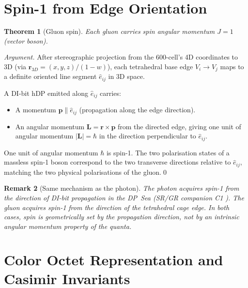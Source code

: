\documentclass[11pt,a4paper]{article}
\newtheorem{theorem}{Theorem}[section]
\newtheorem{remark}[theorem]{Remark}
\begin{document}
\section{Spin-1 from Edge Orientation}

\begin{theorem}[Gluon spin]
\label{thm:spin1}
Each gluon carries spin angular momentum $J = 1$ (vector boson).
\end{theorem}

\begin{proof}[Argument]
After stereographic projection from the 600-cell's 4D coordinates
to 3D (via $\mathbf{r}_{3D} = (x,y,z)/(1-w)$), each tetrahedral
base edge $V_i \to V_j$ maps to a definite oriented line segment
$\hat{e}_{ij}$ in 3D space.

A DI-bit hDP emitted along $\hat{e}_{ij}$ carries:
\begin{itemize}
\item A momentum $\mathbf{p} \parallel \hat{e}_{ij}$ (propagation
  along the edge direction).
\item An angular momentum $\mathbf{L} = \mathbf{r} \times \mathbf{p}$
  from the directed edge, giving one unit of angular momentum
  $|\mathbf{L}| = \hbar$ in the direction perpendicular to
  $\hat{e}_{ij}$.
\end{itemize}
One unit of angular momentum $\hbar$ is spin-1.  The two
polarisation states of a massless spin-1 boson correspond to the
two transverse directions relative to $\hat{e}_{ij}$, matching the
two physical polarisations of the gluon.\qed
\end{proof}

\begin{remark}[Same mechanism as the photon]
The photon acquires spin-1 from the direction of DI-bit propagation
in the DP~Sea (SR/GR companion C1 \citep{abshier_sr}).  The gluon
acquires spin-1 from the direction of the tetrahedral cage edge.
In both cases, spin is geometrically set by the propagation
direction, not by an intrinsic angular momentum property of the
quanta.
\end{remark}

\section{Color Octet Representation and Casimir Invariants}
\end{document}
